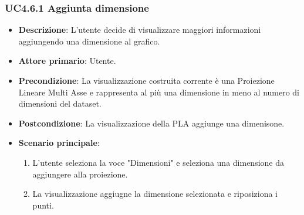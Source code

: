 \subsubsection{UC4.6.1 Aggiunta dimensione}
\label{ssub:uc4.6.1}
\begin{itemize}
    \item \textbf{Descrizione}: L’utente decide di visualizzare maggiori informazioni
                                aggiungendo una dimensione al grafico.

    \item \textbf{Attore primario}: Utente.
    
    \item \textbf{Precondizione}:   La visualizzazione costruita corrente è una Proiezione Lineare Multi Asse
                                    e rappresenta al più una dimensione in meno al numero di dimensioni del dataset.
    \item \textbf{Postcondizione}:  La visualizzazione della PLA aggiunge una dimenisone.

	\item \textbf{Scenario principale}:
        \begin{enumerate}
            \item L'utente seleziona la voce "Dimensioni" e seleziona una dimensione da aggiungere alla proiezione.
            \item La visualizzazione aggiugne la dimensione selezionata e riposiziona i punti.
           
        \end{enumerate}
\end{itemize}

